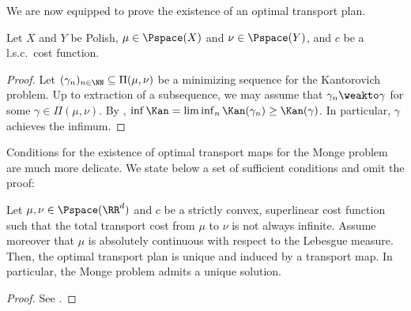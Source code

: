 \documentclass[oneside,reqno,letterpaper]{amsart}
\begin{document}
We are now equipped to prove the existence of an optimal transport plan.
\begin{theorem}[Kantorovich]\label{prop:Kan-existence}
  Let \(X\) and \(Y\) be Polish, \(\mu \in \Pspace(X)\) and \(\nu \in \Pspace(Y)\), and \(c\) be a l.s.c.\ cost function.
\end{theorem}
\begin{proof}
  Let \((\gamma_n)_{n \in \NN} \subseteq \Pi(\mu, \nu)\) be a minimizing sequence for the Kantorovich problem.
  Up to extraction of a subsequence, we may assume that \(\gamma_n \weakto \gamma\) for some \(\gamma \in \Pi(\mu, \nu)\).
  By , \(\inf \Kan = \liminf_n \Kan(\gamma_n) \geq \Kan(\gamma)\).
  In particular, \(\gamma\) achieves the infimum.
\end{proof}


Conditions for the existence of optimal transport maps for the Monge problem are much more delicate.
We state below a set of sufficient conditions and omit the proof:
\begin{theorem}\label{prop:Mon-existence}
  Let \(\mu, \nu \in \Pspace(\RR^d)\) and \(c\) be a strictly convex, superlinear cost function such that the total transport cost from \(\mu\) to \(\nu\) is not always infinite.
  Assume moreover that \(\mu\) is absolutely continuous with respect to the Lebesgue measure.
  Then, the optimal transport plan is unique and induced by a transport map.
  In particular, the Monge problem admits a unique solution.
\end{theorem}
\begin{proof}
  See \cite[Theorem 2.44]{Villani2003}.
\end{proof}
\end{document}

